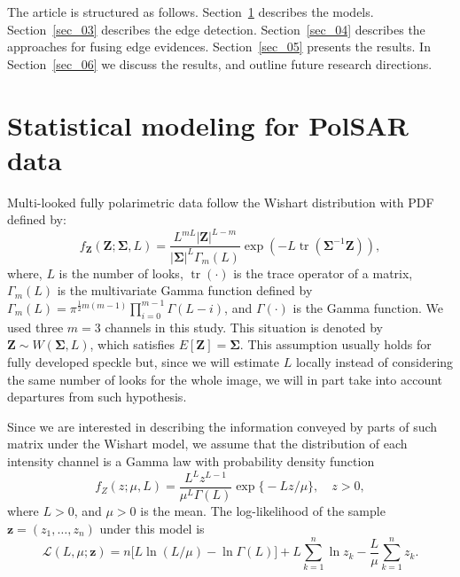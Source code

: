\documentclass[journal]{IEEEtran}
\DeclareMathOperator{\traco}{tr}
\begin{document}

The article is structured as follows.
Section~\ref{sec_02} describes the models.
Section~\ref{sec_03} describes the edge detection.
Section~\ref{sec_04} describes the approaches for fusing edge evidences.
Section~\ref{sec_05} presents the results.
In Section~\ref{sec_06} we discuss the results, and outline future research directions.

\section{Statistical modeling for PolSAR data}\label{sec_02}

Multi-looked fully polarimetric data follow the Wishart distribution with PDF defined by:
\begin{equation}
    f_{\mathbf{Z}}(\mathbf{Z};\mathbf{\Sigma},L)=\frac{L^{mL}|\mathbf{Z}|^{L-m}}{|\mathbf{\Sigma}|^{L}\Gamma_m(L)} \exp(-L\traco(\mathbf{\Sigma}^{-1}\mathbf{Z})),
    \label{eq:DistWishart}
\end{equation} 
where, $L$ is the number of looks, $\traco(\cdot)$ is the trace operator of a matrix, $\Gamma_m(L)$ is the multivariate Gamma function defined by $
	\Gamma_m(L)=\pi^{\frac{1}{2}m(m-1)} \prod_{i=0}^{m-1}\Gamma(L-i)$,
and $\Gamma(\cdot)$ is the Gamma function.
We used three $m=3$ channels in this study. 
This situation is denoted by $\mathbf{Z}\sim W(\mathbf{\Sigma}, L)$, which satisfies $E[\mathbf{Z}]=\mathbf{\Sigma}$. 
This assumption usually holds for fully developed speckle but, since we will estimate $L$ locally instead of considering the same number of looks for the whole image, we will in part take into account departures from such hypothesis.

Since we are interested in describing the information conveyed by parts of such matrix under the Wishart model, we assume that the distribution of each intensity channel is a 
Gamma law with probability density function
\begin{equation}
f_Z(z;\mu,L)=\frac{L^{L}z^{L-1}}{\mu^{L}\Gamma(L)} \exp\big\{-Lz/\mu\big\},\quad z>0,
\label{func_dens_uni_gamma}
\end{equation}
where $L>0$, and
$\mu>0$ is the mean.
The log-likelihood of the sample $\bm z = (z_1,\dots,z_n)$ under this model is
\begin{equation}
\mathcal L( L,\mu; \bm z) = 
n \big[L\ln (L / \mu) - \ln \Gamma(L)\big]
+L \sum_{k=1}^{n}\ln z_k -\frac{L}{\mu}\sum_{k=1}^{n} z_k.
\label{eq:LogLikelihoodGamma}
\end{equation}
\end{document}
